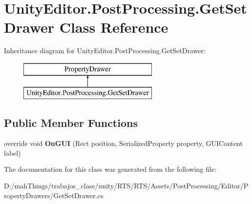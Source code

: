 \hypertarget{class_unity_editor_1_1_post_processing_1_1_get_set_drawer}{}\section{Unity\+Editor.\+Post\+Processing.\+Get\+Set\+Drawer Class Reference}
\label{class_unity_editor_1_1_post_processing_1_1_get_set_drawer}
Inheritance diagram for Unity\+Editor.\+Post\+Processing.\+Get\+Set\+Drawer\+:\begin{figure}[H]
\begin{center}
\leavevmode
\includegraphics[height=2.000000cm]{class_unity_editor_1_1_post_processing_1_1_get_set_drawer}
\end{center}
\end{figure}
\subsection*{Public Member Functions}
\begin{DoxyCompactItemize}
\item 
\mbox{\label{class_unity_editor_1_1_post_processing_1_1_get_set_drawer_a4223a2db683fc9ab228eabdc3af38a98}} 
override void {\bfseries On\+G\+UI} (Rect position, Serialized\+Property property, G\+U\+I\+Content label)
\end{DoxyCompactItemize}


The documentation for this class was generated from the following file\+:\begin{DoxyCompactItemize}
\item 
D\+:/mah\+Things/trabajos\+\_\+clase/unity/\+R\+T\+S/\+R\+T\+S/\+Assets/\+Post\+Processing/\+Editor/\+Property\+Drawers/Get\+Set\+Drawer.\+cs\end{DoxyCompactItemize}
